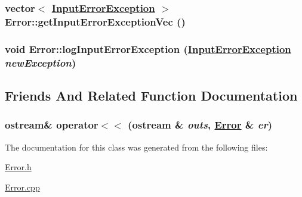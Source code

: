 \hypertarget{class_error_a46183aa0619a520653204dd10ba438e}{
\subsubsection[getInputErrorExceptionVec]{\setlength{\rightskip}{0pt plus 5cm}vector$<$ \hyperlink{class_input_error_exception}{Input\-Error\-Exception} $>$ Error::get\-Input\-Error\-Exception\-Vec ()}}
\label{class_error_a46183aa0619a520653204dd10ba438e}


\hypertarget{class_error_97f2fe5a03ae8c36758744c05939bf02}{
\subsubsection[logInputErrorException]{\setlength{\rightskip}{0pt plus 5cm}void Error::log\-Input\-Error\-Exception (\hyperlink{class_input_error_exception}{Input\-Error\-Exception} {\em new\-Exception})}}
\label{class_error_97f2fe5a03ae8c36758744c05939bf02}




\subsection{Friends And Related Function Documentation}
\hypertarget{class_error_79243d5219bfbe878ff20f74243b1c5a}{
\subsubsection[operator$<$$<$]{\setlength{\rightskip}{0pt plus 5cm}ostream\& operator$<$$<$ (ostream \& {\em outs}, \hyperlink{class_error}{Error} \& {\em er})}}
\label{class_error_79243d5219bfbe878ff20f74243b1c5a}




The documentation for this class was generated from the following files:\begin{CompactItemize}
\item 
\hyperlink{_error_8h}{Error.h}\item 
\hyperlink{_error_8cpp}{Error.cpp}\end{CompactItemize}
